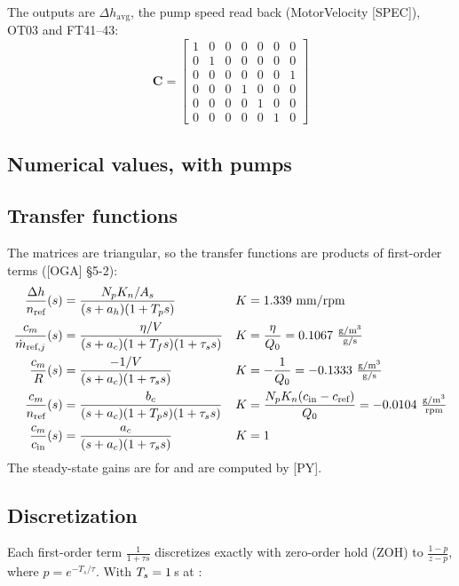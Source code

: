 \documentclass[11pt]{article}
\begin{document}
The outputs are $\Delta h_\text{avg}$, the pump speed read back (MotorVelocity [SPEC]), OT03 and
FT41--43:
\begin{equation}
\mathbf C =
\begin{bmatrix}
1&0&0&0&0&0&0\\
0&1&0&0&0&0&0\\
0&0&0&0&0&0&1\\
0&0&0&1&0&0&0\\
0&0&0&0&1&0&0\\
0&0&0&0&0&1&0
\end{bmatrix}
\end{equation}

\subsection*{Numerical values, \CASNomMode{} with \CASNomPumps{} pumps}
\begin{center}

\end{center}

\subsection{Transfer functions}\label{sec:tf}
The matrices are triangular, so the transfer functions are products of first-order terms
([OGA] §5-2):
\begin{align}
\frac{\Delta h}{n_\text{ref}}(s) &= \frac{N_pK_n/A_s}{(s+a_h)(1+T_ps)}
  && K = \CASGainLevel\ \text{mm/rpm}\\
\frac{c_m}{\dot m_{\text{ref},j}}(s) &= \frac{\eta/V}{(s+a_c)(1+T_fs)(1+\tau_ss)}
  && K = \frac{\eta}{Q_0} = \CASGainOxy\ \tfrac{\text{g/m}^3}{\text{g/s}}\\
\frac{c_m}{R}(s) &= \frac{-1/V}{(s+a_c)(1+\tau_ss)}
  && K = -\frac{1}{Q_0} = \CASGainR\ \tfrac{\text{g/m}^3}{\text{g/s}}\\
\frac{c_m}{n_\text{ref}}(s) &= \frac{b_c}{(s+a_c)(1+T_ps)(1+\tau_ss)}
  && K = \frac{N_pK_n(c_\text{in}-c_\text{ref})}{Q_0} = \CASGainN\ \tfrac{\text{g/m}^3}{\text{rpm}}\\
\frac{c_m}{c_\text{in}}(s) &= \frac{a_c}{(s+a_c)(1+\tau_ss)}
  && K = 1
\end{align}
The steady-state gains are for \CASNomMode{} and are computed by [PY].

\subsection{Discretization}
Each first-order term $\frac{1}{1+\tau s}$ discretizes exactly with zero-order hold (ZOH) to
$\frac{1-p}{z-p}$, where $p=e^{-T_s/\tau}$. With $T_s = 1$\,s at \CASNomMode{}:
\end{document}
